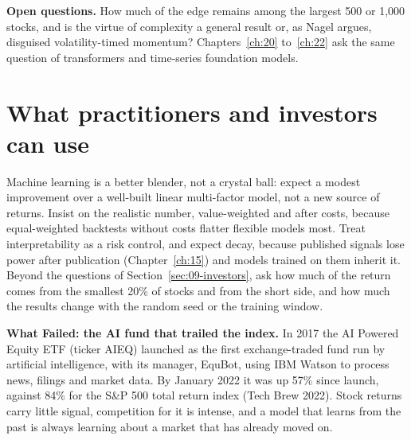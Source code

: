 \label{sec:20-open}
\textbf{Open questions.} How much of the edge remains among the largest 500 or 1,000 stocks, and is the virtue of complexity a general result or, as Nagel argues, disguised volatility-timed momentum? Chapters~\ref{ch:20} to~\ref{ch:22} ask the same question of transformers and time-series foundation models.

\section{What practitioners and investors can use}
\label{sec:20-investors}

Machine learning is a better blender, not a crystal ball: expect a modest improvement over a well-built linear multi-factor model, not a new source of returns. Insist on the realistic number, value-weighted and after costs, because equal-weighted backtests without costs flatter flexible models most. Treat interpretability as a risk control, and expect decay, because published signals lose power after publication (Chapter~\ref{ch:15}) and models trained on them inherit it. Beyond the questions of Section~\ref{sec:09-investors}, ask how much of the return comes from the smallest 20\% of stocks and from the short side, and how much the results change with the random seed or the training window.

\begin{callout}
\textbf{What Failed: the AI fund that trailed the index.} In 2017 the AI Powered Equity ETF (ticker AIEQ) launched as the first exchange-traded fund run by artificial intelligence, with its manager, EquBot, using IBM Watson to process news, filings and market data. By January 2022 it was up 57\% since launch, against 84\% for the S\&P 500 total return index (Tech Brew 2022). Stock returns carry little signal, competition for it is intense, and a model that learns from the past is always learning about a market that has already moved on.
\end{callout}

\makeatletter
{}
\makeatother

